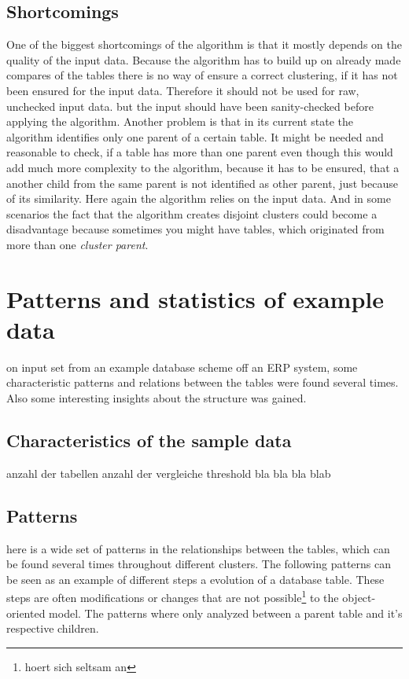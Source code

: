 \documentclass[10pt, journal, twocolumn]{IEEEtran}
\begin{document}
\subsection{Shortcomings}
One of the biggest shortcomings of the algorithm is that it mostly depends on the quality of the input data. Because the algorithm has to build up on already made compares of the tables there is no way of ensure a correct clustering, if it has not been ensured for the input data. Therefore it should not be used for raw, unchecked input data. but the input should have been sanity-checked before applying the algorithm. Another problem is that in its current state the algorithm identifies only one parent of a certain table. It might be needed and reasonable to check, if a table has more than one parent even though this would add much more complexity to the algorithm, because it has to be ensured, that a another child from the same parent is not identified as other parent, just because of its similarity. Here again the algorithm relies on the input data. And in some scenarios the fact that the algorithm creates disjoint clusters could become a disadvantage because sometimes you might have tables, which originated from more than one \textit{cluster parent}.
\section{Patterns and statistics of example data}
 on input set from an example database scheme off an ERP system, some characteristic patterns and relations between the tables were found several times. Also some interesting insights about the structure was gained.
\subsection{Characteristics of the sample data}
 anzahl der tabellen anzahl der vergleiche threshold bla bla bla blab
\subsection{Patterns}
here is a wide set of patterns in the relationships between the tables, which can be found several times throughout different clusters. The following patterns can be seen as an example of different steps a evolution of a database table. These steps are often modifications or changes that are not possible\footnote{hoert sich seltsam an} to the object-oriented model. The patterns where only analyzed between a parent table and it's respective children.
\end{document}
